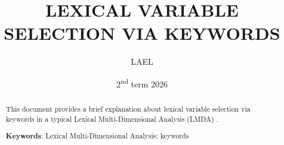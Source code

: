 \title{
    \LARGE \MakeUppercase{Lexical Variable Selection via Keywords}
}
\author{LAEL} %
\date{2\textsuperscript{nd} term 2026}
\maketitle
\begin{abstract}
    This document provides a brief explanation about lexical variable selection via keywords in a typical Lexical Multi-Dimensional Analysis (LMDA) \parencite{berbersardinhaLexicalMultiDimensionalAnalysis2025}.

    \vspace{1em}
    \textbf{Keywords}: Lexical Multi-Dimensional Analysis; keywords
\end{abstract}

\listoffigures
\tableofcontents
